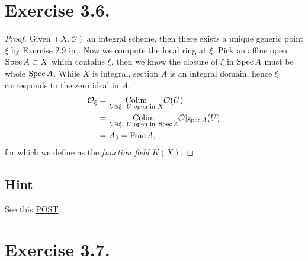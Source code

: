 \section{Exercise 3.6.}

\begin{proof}
Given $(X,\mathcal O)$ an integral scheme, then there exists a unique generic point $\xi$ by Exercise 2.9 in . Now we compute the local ring at $\xi$. Pick an affine open $\operatorname{Spec} A\subset X$ which contains $\xi$, then we know the closure of $\xi$ in $\operatorname{Spec} A$ must be whole $\operatorname{Spec} A$. While $X$ is integral, section $A$ is an integral domain, hence $\xi$ corresponds to the zero ideal in $A$.
\begin{align*}
    \mathcal O_{\xi} =&~ \underset{U \ni \xi,~ U \text{ open in } X}{\operatorname{Colim}} \mathcal O(U)\\
    =&~ \underset{U \ni \xi,~ U \text{ open in } \operatorname{Spec} A}{\operatorname{Colim}} \mathcal O\vert_{\operatorname{Spec} A}(U)\\ 
    =&~ A_{0}=\operatorname{Frac} A,
\end{align*} for which we define as the \textit{function field} $K(X)$.

\end{proof}

\subsection{Hint}

See this \href{https://math.stackexchange.com/questions/218767/relation-of-function-field-of-a-scheme-to-the-local-ring-of-its-prime-divisor}{POST}.

\section{Exercise 3.7.}

\textit{}